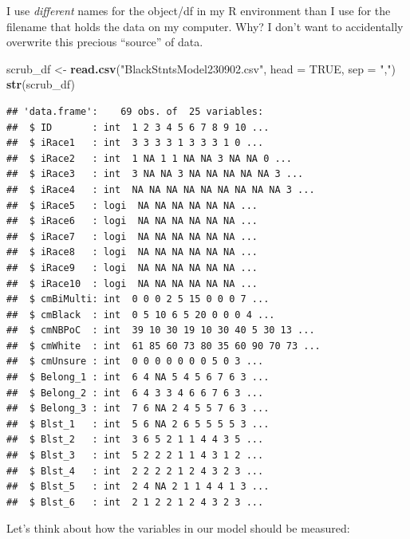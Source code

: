 \documentclass[
  11pt,
]{book}
\newenvironment{Shaded}{\begin{snugshade}}{\end{snugshade}}
\newcommand{\AttributeTok}[1]{\textcolor[rgb]{0.27,0.27,0.27}{#1}}
\newcommand{\ConstantTok}[1]{\textcolor[rgb]{0.37,0.37,0.37}{#1}}
\newcommand{\FunctionTok}[1]{\textcolor[rgb]{0.27,0.27,0.27}{\textbf{#1}}}
\newcommand{\NormalTok}[1]{#1}
\newcommand{\OtherTok}[1]{\textcolor[rgb]{0.37,0.37,0.37}{#1}}
\newcommand{\StringTok}[1]{\textcolor[rgb]{0.5,0.5,0.5}{#1}}
\begin{document}
I use \emph{different} names for the object/df in my R environment than I use for the filename that holds the data on my computer. Why? I don't want to accidentally overwrite this precious ``source'' of data.

\begin{Shaded}
\begin{Highlighting}[]
\NormalTok{scrub\_df }\OtherTok{\textless{}{-}} \FunctionTok{read.csv}\NormalTok{(}\StringTok{"BlackStntsModel230902.csv"}\NormalTok{, }\AttributeTok{head =} \ConstantTok{TRUE}\NormalTok{, }\AttributeTok{sep =} \StringTok{","}\NormalTok{)}
\FunctionTok{str}\NormalTok{(scrub\_df)}
\end{Highlighting}
\end{Shaded}

\begin{verbatim}
## 'data.frame':    69 obs. of  25 variables:
##  $ ID       : int  1 2 3 4 5 6 7 8 9 10 ...
##  $ iRace1   : int  3 3 3 3 1 3 3 3 1 0 ...
##  $ iRace2   : int  1 NA 1 1 NA NA 3 NA NA 0 ...
##  $ iRace3   : int  3 NA NA 3 NA NA NA NA NA 3 ...
##  $ iRace4   : int  NA NA NA NA NA NA NA NA NA 3 ...
##  $ iRace5   : logi  NA NA NA NA NA NA ...
##  $ iRace6   : logi  NA NA NA NA NA NA ...
##  $ iRace7   : logi  NA NA NA NA NA NA ...
##  $ iRace8   : logi  NA NA NA NA NA NA ...
##  $ iRace9   : logi  NA NA NA NA NA NA ...
##  $ iRace10  : logi  NA NA NA NA NA NA ...
##  $ cmBiMulti: int  0 0 0 2 5 15 0 0 0 7 ...
##  $ cmBlack  : int  0 5 10 6 5 20 0 0 0 4 ...
##  $ cmNBPoC  : int  39 10 30 19 10 30 40 5 30 13 ...
##  $ cmWhite  : int  61 85 60 73 80 35 60 90 70 73 ...
##  $ cmUnsure : int  0 0 0 0 0 0 0 5 0 3 ...
##  $ Belong_1 : int  6 4 NA 5 4 5 6 7 6 3 ...
##  $ Belong_2 : int  6 4 3 3 4 6 6 7 6 3 ...
##  $ Belong_3 : int  7 6 NA 2 4 5 5 7 6 3 ...
##  $ Blst_1   : int  5 6 NA 2 6 5 5 5 5 3 ...
##  $ Blst_2   : int  3 6 5 2 1 1 4 4 3 5 ...
##  $ Blst_3   : int  5 2 2 2 1 1 4 3 1 2 ...
##  $ Blst_4   : int  2 2 2 2 1 2 4 3 2 3 ...
##  $ Blst_5   : int  2 4 NA 2 1 1 4 4 1 3 ...
##  $ Blst_6   : int  2 1 2 2 1 2 4 3 2 3 ...
\end{verbatim}

Let's think about how the variables in our model should be measured:
\end{document}
